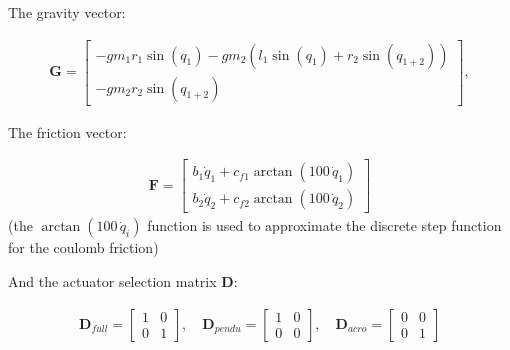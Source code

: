     The gravity vector:
    
    \begin{equation}
    \begin{split}
    \mathbf{G} = \left[
    \begin{matrix}
    - g m_{1} r_{1} \sin(q_1) - g m_{2} \left(l_{1} \sin(q_1) + r_{2} \sin(q_{1+2}) \right) \\
    - g m_{2} r_{2} \sin(q_{1+2})
    \end{matrix}
    \right],
    \label{eq:gravity_matrix}
    \end{split}
    \end{equation}
    
    The friction vector:
    
    \begin{equation}
        \begin{split}
            \mathbf{F} =
            \left[
                \begin{matrix}
                    b_1 \dot{q}_1 + c_{f1} \arctan(100\,\dot{q}_1) \\
                    b_2 \dot{q}_2 + c_{f2} \arctan(100\,\dot{q}_2)
                \end{matrix}
            \right]
        \end{split}
        \label{eq:friction_function}
    \end{equation}
    (the \(\arctan(100\,\dot{q}_i)\) function is used to approximate the discrete step function for the coulomb friction)

    And the actuator selection matrix \(\mathbf{D}\):
    
    \begin{equation}
        \begin{split}
            \mathbf{D}_{full} =
            \left[
                \begin{matrix}
                    1 & 0 \\
                    0 & 1
                \end{matrix}
            \right],
            \quad
            \mathbf{D}_{pendu} =
            \left[
                \begin{matrix}
                    1 & 0 \\
                    0 & 0
                \end{matrix}
            \right],
            \quad
            \mathbf{D}_{acro} =
            \left[
                \begin{matrix}
                    0 & 0 \\
                    0 & 1
                \end{matrix}
            \right]
        \end{split}
    \end{equation}
    
